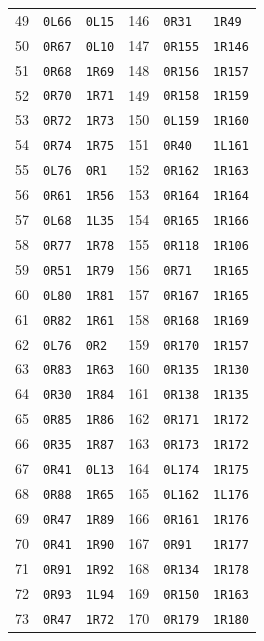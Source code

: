 \begin{longtable}{@{}rll@{\qquad}rll@{}}
49&\texttt{0L66}&\texttt{0L15}&146&\texttt{0R31}&\texttt{1R49}\\
50&\texttt{0R67}&\texttt{0L10}&147&\texttt{0R155}&\texttt{1R146}\\
51&\texttt{0R68}&\texttt{1R69}&148&\texttt{0R156}&\texttt{1R157}\\
52&\texttt{0R70}&\texttt{1R71}&149&\texttt{0R158}&\texttt{1R159}\\
53&\texttt{0R72}&\texttt{1R73}&150&\texttt{0L159}&\texttt{1R160}\\
54&\texttt{0R74}&\texttt{1R75}&151&\texttt{0R40}&\texttt{1L161}\\
55&\texttt{0L76}&\texttt{0R1}&152&\texttt{0R162}&\texttt{1R163}\\
56&\texttt{0R61}&\texttt{1R56}&153&\texttt{0R164}&\texttt{1R164}\\
57&\texttt{0L68}&\texttt{1L35}&154&\texttt{0R165}&\texttt{1R166}\\
58&\texttt{0R77}&\texttt{1R78}&155&\texttt{0R118}&\texttt{1R106}\\
59&\texttt{0R51}&\texttt{1R79}&156&\texttt{0R71}&\texttt{1R165}\\
60&\texttt{0L80}&\texttt{1R81}&157&\texttt{0R167}&\texttt{1R165}\\
61&\texttt{0R82}&\texttt{1R61}&158&\texttt{0R168}&\texttt{1R169}\\
62&\texttt{0L76}&\texttt{0R2}&159&\texttt{0R170}&\texttt{1R157}\\
63&\texttt{0R83}&\texttt{1R63}&160&\texttt{0R135}&\texttt{1R130}\\
64&\texttt{0R30}&\texttt{1R84}&161&\texttt{0R138}&\texttt{1R135}\\
65&\texttt{0R85}&\texttt{1R86}&162&\texttt{0R171}&\texttt{1R172}\\
66&\texttt{0R35}&\texttt{1R87}&163&\texttt{0R173}&\texttt{1R172}\\
67&\texttt{0R41}&\texttt{0L13}&164&\texttt{0L174}&\texttt{1R175}\\
68&\texttt{0R88}&\texttt{1R65}&165&\texttt{0L162}&\texttt{1L176}\\
69&\texttt{0R47}&\texttt{1R89}&166&\texttt{0R161}&\texttt{1R176}\\
70&\texttt{0R41}&\texttt{1R90}&167&\texttt{0R91}&\texttt{1R177}\\
71&\texttt{0R91}&\texttt{1R92}&168&\texttt{0R134}&\texttt{1R178}\\
72&\texttt{0R93}&\texttt{1L94}&169&\texttt{0R150}&\texttt{1R163}\\
73&\texttt{0R47}&\texttt{1R72}&170&\texttt{0R179}&\texttt{1R180}\\

\end{longtable}
